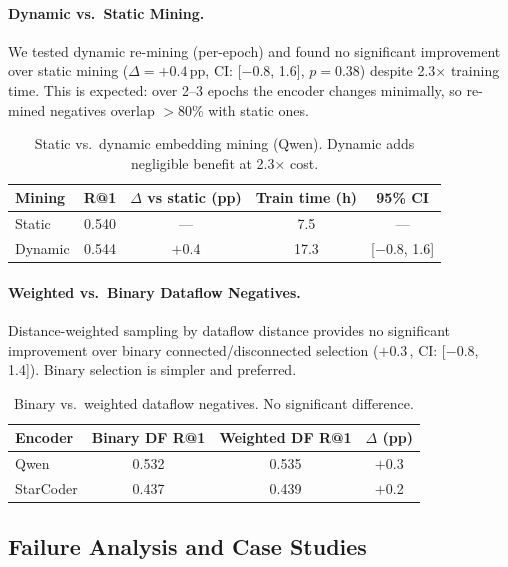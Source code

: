 \documentclass[11pt]{article}
\newcommand{\pp}{\,\text{pp}}
\begin{document}
\paragraph{Dynamic vs.\ Static Mining.}
We tested dynamic re-mining (per-epoch) and found no significant improvement over static mining ($\Delta = +0.4\pp{}$, CI: [$-$0.8, 1.6], $p = 0.38$) despite 2.3$\times$ training time.
This is expected: over 2--3 epochs the encoder changes minimally, so re-mined negatives overlap $>$80\% with static ones.

\begin{table}[t]
\centering
\caption{Static vs.\ dynamic embedding mining (Qwen). Dynamic adds negligible benefit at 2.3$\times$ cost.}
\label{tab:dynamic}
\begin{tabular}{lcccc}
\toprule
Mining & R@1 & $\Delta$ vs static (pp) & Train time (h) & 95\% CI \\
\midrule
Static  & 0.540 & --- & 7.5 & --- \\
Dynamic & 0.544 & $+$0.4 & 17.3 & [$-$0.8, 1.6] \\
\bottomrule
\end{tabular}
\end{table}

\paragraph{Weighted vs.\ Binary Dataflow Negatives.}
Distance-weighted sampling by dataflow distance provides no significant improvement over binary connected/disconnected selection ($+$0.3\pp{}, CI: [$-$0.8, 1.4]).
Binary selection is simpler and preferred.

\begin{table}[t]
\centering
\caption{Binary vs.\ weighted dataflow negatives. No significant difference.}
\label{tab:weighted}
\begin{tabular}{lccc}
\toprule
Encoder & Binary DF R@1 & Weighted DF R@1 & $\Delta$ (pp) \\
\midrule
Qwen     & 0.532 & 0.535 & $+$0.3 \\
StarCoder & 0.437 & 0.439 & $+$0.2 \\
\bottomrule
\end{tabular}
\end{table}

\subsection{Failure Analysis and Case Studies}
\label{sec:failure}
\end{document}
